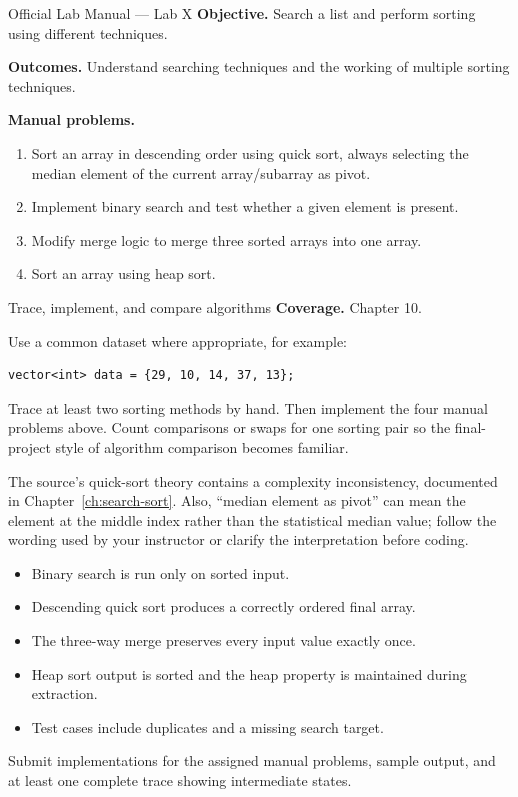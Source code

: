 
\begin{sourcealignment}{Official Lab Manual --- Lab X}
\textbf{Objective.} Search a list and perform sorting using different techniques.

\textbf{Outcomes.} Understand searching techniques and the working of multiple sorting techniques.

\textbf{Manual problems.}
\begin{enumerate}
  \item Sort an array in descending order using quick sort, always selecting the median element of the current array/subarray as pivot.
  \item Implement binary search and test whether a given element is present.
  \item Modify merge logic to merge three sorted arrays into one array.
  \item Sort an array using heap sort.
\end{enumerate}
\end{sourcealignment}

\begin{labproject}{Trace, implement, and compare algorithms}
\textbf{Coverage.} Chapter 10.

Use a common dataset where appropriate, for example:
\begin{lstlisting}
vector<int> data = {29, 10, 14, 37, 13};
\end{lstlisting}

\begin{tryit}
Trace at least two sorting methods by hand. Then implement the four manual problems above. Count comparisons or swaps for one sorting pair so the final-project style of algorithm comparison becomes familiar.
\end{tryit}

\begin{clarification}
The source's quick-sort theory contains a complexity inconsistency, documented in Chapter~\ref{ch:search-sort}. Also, ``median element as pivot'' can mean the element at the middle index rather than the statistical median value; follow the wording used by your instructor or clarify the interpretation before coding.
\end{clarification}
\end{labproject}

\begin{verification}
\begin{itemize}
  \item Binary search is run only on sorted input.
  \item Descending quick sort produces a correctly ordered final array.
  \item The three-way merge preserves every input value exactly once.
  \item Heap sort output is sorted and the heap property is maintained during extraction.
  \item Test cases include duplicates and a missing search target.
\end{itemize}
\end{verification}

\begin{labdeliverable}
Submit implementations for the assigned manual problems, sample output, and at least one complete trace showing intermediate states.
\end{labdeliverable}
